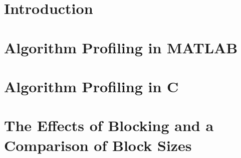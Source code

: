 \section{Introduction}
\label{software:Introduction}


\section{Algorithm Profiling in MATLAB}
\label{software:algorithmProfiling:matlab}


\section{Algorithm Profiling in C}
\label{software:algorithmProfiling:c}


\section{The Effects of Blocking and a Comparison of Block Sizes}
\label{software:blockSize}


